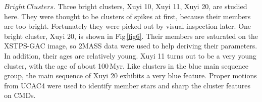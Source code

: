 \documentclass[]{raa_rb}
\begin{document}
\vspace{3ex}
$Bright~Clusters.$ Three bright clusters, Xuyi 10, Xuyi 11, Xuyi 20, are studied here.  They were thought to be clusters of spikes at first, because their members are too bright. Fortunately they were picked out by visual inspection later. One bright cluster, Xuyi 20, is shown in Fig\,\ref{fig6}. Their members are saturated on the XSTPS-GAC image, so 2MASS data were used to help deriving their parameters. In addition, their ages are relatively young.  Xuyi 11 turns out to be a very young cluster, with the age of about 100\,Myr. Like clusters in the blue main sequence group, the main sequence of Xuyi 20 exhibits a very blue feature. Proper motions from UCAC4 were used to identify member stars and sharp the cluster features on CMDs.  
\end{document}

